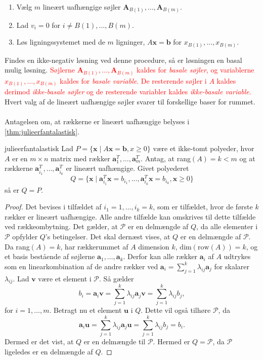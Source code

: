 %
\begin{enumerate}
\item Vælg $m$ lineært uafhængige søjler $\textbf{A}_{B(1)},\ldots,\textbf{A}_{B(m)}.$
\item Lad $v_i=0$ for $i \neq B(1),\ldots,B(m).$
\item Løs ligningssystemet med de $m$ ligninger, $A\textbf{x}=\textbf{b}$ for $x_{B(1)}, \ldots , x_{B(m)}.$
\end{enumerate}
%
Findes en ikke-negativ løsning ved denne procedure, så er løsningen en basal mulig løsning.
\textcolor{red}{Søjlerne $\textbf{A}_{B(1)},\ldots,\textbf{A}_{B(m)}$ kaldes for \textit{basale søjler}, og variablerne $x_{B(1)},\ldots,x_{B(m)}$ kaldes for \textit{basale variable}. De resterende søjler i $A$ kaldes derimod \textit{ikke-basale søjler} og de resterende variabler kaldes \textit{ikke-basale variable}. }
Hvert valg af de lineært uafhængige søjler svarer til forskellige baser for rummet.
\\\\
%
Antagelsen om, at rækkerne er lineært uafhængige belyses i \ref{thm:julieerfantalastisk}.
%
\begin{thm}{}{julieerfantalastisk}
Lad $P=\{\textbf{x} \mid  A\textbf{x}=\textbf{b},x \geq 0\}$ være et ikke-tomt polyeder, hvor $A$ er en $m \times n$ matrix med rækker $\textbf{a}^{T}_{1},\ldots,\textbf{a}^{T}_{m}$.
Antag, at rang$(A)=k<m$ og at rækkerne $\textbf{a}^T_{i_1},\ldots,\textbf{a}^T_{i_k}$ er lineært uafhængige. Givet polyederet 
$$Q=\{\textbf{x} \mid \textbf{a}^T_{i_1}\textbf{x}=b_{i_1},\ldots,\textbf{a}^T_{i_k}\textbf{x}=b_{i_k}, \textbf{x} \geq 0  \}$$ 
så er $Q=P$.
\end{thm}
\begin{proof}
Det bevises i tilfældet af $i_1=1,\ldots,i_k=k$, som er tilfældet, hvor de første $k$ rækker er lineært uafhængige. 
Alle andre tilfælde kan omskrives til dette tilfælde ved rækkeombytning. 
Det gælder, at $\mathcal{P}$ er en delmængde af $Q$, da alle elementer i $\mathcal{P}$ opfylder $Q$'s betingelser.
Det skal dernæst vises, at $Q$ er en delmængde af $\mathcal{P}$.
Da rang$(A)=k$, har rækkerummet af $A$ dimension $k$, $\text{dim}(\text{row}(A)) = k$, og et basis bestående af søjlerne $\textbf{a}_1,\ldots,\textbf{a}_k$. 
Derfor kan alle rækker $\textbf{a}_i$ af $A$ udtrykes som en linearkombination af de andre rækker ved $\textbf{a}_i=\sum^{k}_{j=1}\lambda_{ij}\textbf{a}_j$ for skalarer $\lambda_{ij}$. 
Lad $\textbf{v}$ være et element i $\mathcal{P}$. 
Så gælder
$$b_i=\textbf{a}_i\textbf{v}=\sum^{k}_{j=1}\lambda_{ij}\textbf{a}_j\textbf{v}=\sum^{k}_{j=1}\lambda_{ij}b_j,$$
for $i=1,\ldots,m.$
Betragt nu et element $\textbf{u}$ i $Q$. 
Dette vil også tilhøre $\mathcal{P}$, da
$$ \textbf{a}_i\textbf{u}=\sum^{k}_{j=1}\lambda_{ij}\textbf{a}_j\textbf{u}=\sum^{k}_{j=1}\lambda_{ij}b_j=b_i.$$
Dermed er det vist, at $Q$ er en delmængde til $\mathcal{P}$.
Hermed er $Q=\mathcal{P}$, da $\mathcal{P}$ ligeledes er en delmængde af $Q$.
\end{proof} \\